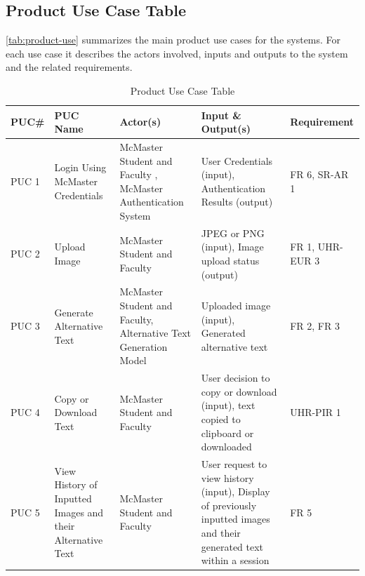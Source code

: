 \documentclass[12pt]{article}
\begin{document}
\subsection{Product Use Case Table}
\autoref{tab:product-use} summarizes the main product use cases
for the systems. For each use case it describes the actors involved,
inputs and outputs to the system and the related requirements.
\begin{table}[H]
  \centering
  \caption{Product Use Case Table}
  \label{tab:product-use}
  \begin{tabular}{|p{1.3cm}|p{2.5cm}|p{3cm}|p{4cm}|p{2.6cm}|}
    \hline
    \textbf{PUC\#} & \textbf{PUC Name} & \textbf{Actor(s)} &
    \textbf{Input \& Output(s)} & \textbf{Requirement} \\
    \hline
    PUC 1 & Login Using McMaster Credentials &  McMaster Student and
    Faculty , McMaster Authentication System & User Credentials
    (input), Authentication Results (output) & FR 6, SR-AR 1\\
    \hline
    PUC 2 & Upload Image & McMaster Student and Faculty & JPEG or PNG
    (input), Image upload status (output) & FR 1, UHR-EUR 3 \\
    \hline
    PUC 3 & Generate Alternative Text &  McMaster Student and
    Faculty, Alternative Text Generation Model & Uploaded image
    (input), Generated alternative text  & FR 2, FR 3\\
    \hline
    PUC 4 & Copy or Download Text & McMaster Student and Faculty &
    User decision to copy or download (input), text copied to
    clipboard or downloaded & UHR-PIR 1\\
    \hline
    PUC 5 & View History of Inputted Images and their Alternative
    Text & McMaster Student and Faculty & User request to view
    history (input), Display of previously inputted images and their
    generated text within a session & FR 5\\
    \hline
  \end{tabular}
\end{table}
\end{document}
